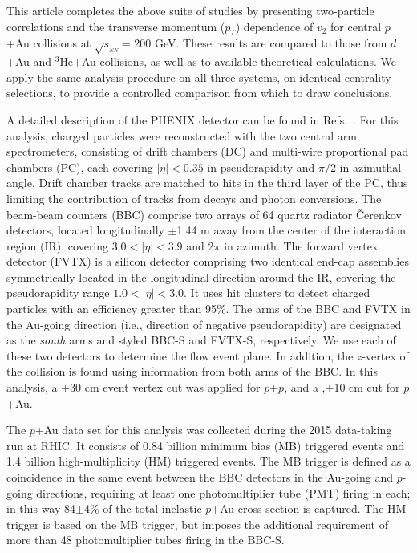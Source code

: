 \documentclass[%
reprint,
showpacs,preprintnumbers,
 amsmath,amssymb,
 aps,
]{revtex4-1}
\newcommand{\pt}{\mbox{$p_T$}\xspace}
\newcommand{\sqsn}{\mbox{$\sqrt{s_{_{NN}}}$}\xspace}
\newcommand{\dau}{\mbox{$d$+Au}\xspace}
\newcommand{\pau}{\mbox{$p$+Au}\xspace}
\newcommand{\hau}{\mbox{$^3\text{He}$+Au}\xspace}
\newcommand{\pp}{\mbox{$p$+$p$}\xspace}
\newcommand{\bbceta}{\mbox{$3.0<|\eta|<3.9$}\xspace}
\begin{document}
This article completes the above suite of studies by presenting two-particle correlations and the transverse momentum (\pt) dependence of $v_2$ for central \pau collisions at \sqsn = 200 GeV. These results are compared to those from \dau and \hau collisions, as well as to available theoretical calculations. We apply the same analysis procedure on all three systems, on identical centrality selections, to provide a controlled comparison from which to draw conclusions.

A detailed description of the PHENIX detector can be found in Refs.~\cite{Adcox2003469,fvtx}. For this analysis, charged particles were reconstructed with the two central arm spectrometers, consisting of drift chambers (DC) and multi-wire proportional pad chambers (PC), each covering $|\eta|<0.35$ in pseudorapidity and $\pi/2$ in azimuthal angle. Drift chamber tracks are matched to hits in the third layer of the PC, thus limiting the contribution of tracks from decays and photon conversions. The beam-beam counters (BBC) comprise two arrays of 64 quartz radiator \v{C}erenkov detectors, located longitudinally $\pm$1.44 m away from the center of the interaction region (IR), covering \bbceta and 2$\pi$ in azimuth. The forward vertex detector (FVTX) is a silicon detector comprising two identical end-cap assemblies symmetrically located in the longitudinal direction around the IR, covering the pseudorapidity range $1.0 < |\eta| < 3.0$. It uses hit clusters to detect charged particles with an efficiency greater than 95\%.
The arms of the BBC and FVTX in the Au-going direction (i.e., direction of negative pseudorapidity) are designated as the \emph{south} arms and styled BBC-S and FVTX-S, respectively. We use each of these two detectors to determine the flow event plane. In addition, the $z$-vertex of the collision is found using information from both arms of the BBC. In this analysis, a $\pm$30 cm event vertex cut was applied for \pp, and a ,$\pm$10 cm cut for \pau.

The \pau data set for this analysis was collected during the 2015 data-taking run at RHIC. It consists of 0.84 billion minimum bias (MB) triggered events and 1.4 billion high-multiplicity (HM) triggered events. The MB trigger is defined as a coincidence in the same event between the BBC detectors in the Au-going and $p$-going directions, requiring at least one photomultiplier tube (PMT) firing in each; in this way 84$\pm$4\% of the total inelastic \pau cross section is captured. The HM trigger is based on the MB trigger, but imposes the additional requirement of more than 48 photomultiplier tubes firing in the BBC-S. 
\end{document}
